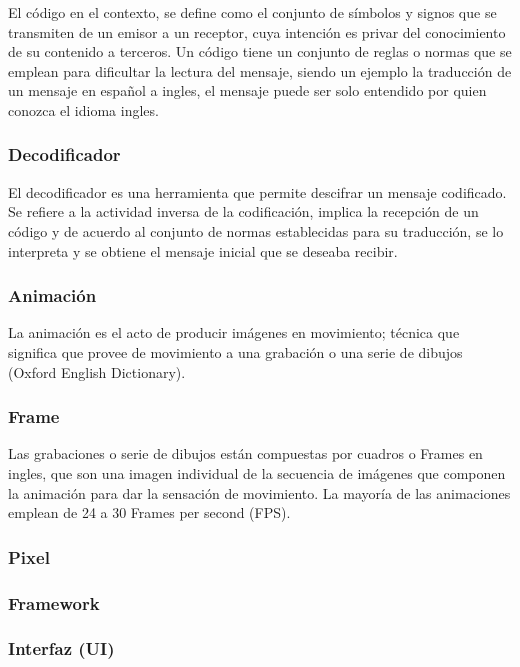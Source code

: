 El código en el contexto, se define como el conjunto de símbolos y signos que se transmiten de un emisor a un receptor, cuya intención es privar del conocimiento de su contenido a terceros. Un código tiene un conjunto de reglas o normas que se emplean para dificultar la lectura del mensaje, siendo un ejemplo la traducción de un mensaje en español a ingles, el mensaje puede ser solo entendido por quien conozca el idioma ingles.

\subsubsection{Decodificador}

El decodificador es una herramienta que permite descifrar un mensaje codificado. Se refiere a la actividad inversa de la codificación, implica la recepción de un código y de acuerdo al conjunto de normas establecidas para su traducción, se lo interpreta y se obtiene el mensaje inicial que se deseaba recibir.


\subsubsection{Animación}

La animación es el acto de producir imágenes en movimiento; técnica que significa que provee de movimiento a una grabación o una serie de dibujos (Oxford English Dictionary). 

\subsubsection{Frame}
Las grabaciones o serie de dibujos están compuestas por cuadros o Frames en ingles, que son una imagen individual de la secuencia de imágenes que componen la animación para dar la sensación de movimiento. La mayoría de las animaciones emplean de 24 a 30 Frames per second (FPS). 

\subsubsection{Pixel}
\subsubsection{Framework}

\subsubsection{Interfaz (UI)}

